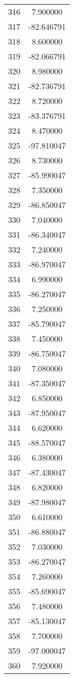 \documentclass[12pt]{article}
\begin{document}
\begin{longtable}{@{}cc@{}}
316 & 7.900000 \\
317 & -82.646791 \\
318 & 8.600000 \\
319 & -82.066791 \\
320 & 8.980000 \\
321 & -82.736791 \\
322 & 8.720000 \\
323 & -83.376791 \\
324 & 8.470000 \\
325 & -97.810047 \\
326 & 8.730000 \\
327 & -85.990047 \\
328 & 7.350000 \\
329 & -86.850047 \\
330 & 7.040000 \\
331 & -86.340047 \\
332 & 7.240000 \\
333 & -86.970047 \\
334 & 6.990000 \\
335 & -86.270047 \\
336 & 7.250000 \\
337 & -85.790047 \\
338 & 7.450000 \\
339 & -86.750047 \\
340 & 7.080000 \\
341 & -87.350047 \\
342 & 6.850000 \\
343 & -87.950047 \\
344 & 6.620000 \\
345 & -88.570047 \\
346 & 6.380000 \\
347 & -87.430047 \\
348 & 6.820000 \\
349 & -87.980047 \\
350 & 6.610000 \\
351 & -86.880047 \\
352 & 7.030000 \\
353 & -86.270047 \\
354 & 7.260000 \\
355 & -85.690047 \\
356 & 7.480000 \\
357 & -85.130047 \\
358 & 7.700000 \\
359 & -97.000047 \\
360 & 7.920000 \\

\end{longtable}
\end{document}
